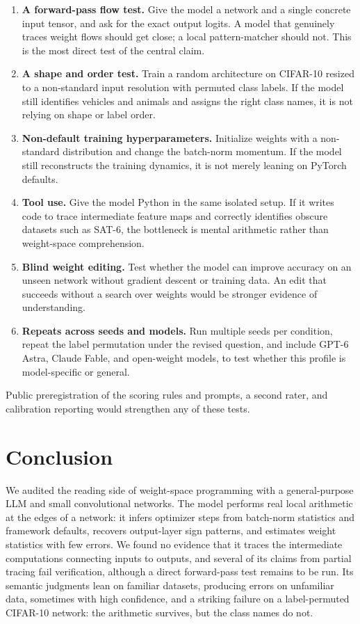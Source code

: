 \documentclass[11pt]{article}
\begin{document}
\begin{enumerate}[leftmargin=*]
  \item \textbf{A forward-pass flow test.} Give the model a network and a single concrete input tensor, and ask for the exact output logits. A model that genuinely traces weight flows should get close; a local pattern-matcher should not. This is the most direct test of the central claim.
  \item \textbf{A shape and order test.} Train a random architecture on CIFAR-10 resized to a non-standard input resolution with permuted class labels. If the model still identifies vehicles and animals and assigns the right class names, it is not relying on shape or label order.
  \item \textbf{Non-default training hyperparameters.} Initialize weights with a non-standard distribution and change the batch-norm momentum. If the model still reconstructs the training dynamics, it is not merely leaning on PyTorch defaults.
  \item \textbf{Tool use.} Give the model Python in the same isolated setup. If it writes code to trace intermediate feature maps and correctly identifies obscure datasets such as SAT-6, the bottleneck is mental arithmetic rather than weight-space comprehension.
  \item \textbf{Blind weight editing.} Test whether the model can improve accuracy on an unseen network without gradient descent or training data. An edit that succeeds without a search over weights would be stronger evidence of understanding.
  \item \textbf{Repeats across seeds and models.} Run multiple seeds per condition, repeat the label permutation under the revised question, and include GPT-6 Astra, Claude Fable, and open-weight models, to test whether this profile is model-specific or general.
\end{enumerate}

Public preregistration of the scoring rules and prompts, a second rater, and calibration reporting would strengthen any of these tests.

\section{Conclusion}

We audited the reading side of weight-space programming with a general-purpose LLM and small convolutional networks. The model performs real local arithmetic at the edges of a network: it infers optimizer steps from batch-norm statistics and framework defaults, recovers output-layer sign patterns, and estimates weight statistics with few errors. We found no evidence that it traces the intermediate computations connecting inputs to outputs, and several of its claims from partial tracing fail verification, although a direct forward-pass test remains to be run. Its semantic judgments lean on familiar datasets, producing errors on unfamiliar data, sometimes with high confidence, and a striking failure on a label-permuted CIFAR-10 network: the arithmetic survives, but the class names do not.
\end{document}
